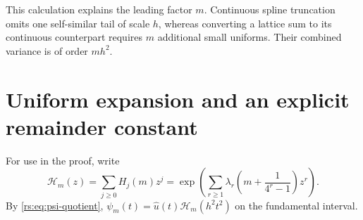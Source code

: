 \documentclass[11pt,a4paper,oneside,openany]{book}
\numberwithin{equation}{chapter}
\theoremstyle{definition}
\theoremstyle{remark}
\begin{document}
This calculation explains the leading factor $m$. Continuous spline
truncation omits one self-similar tail of scale $h$, whereas converting
a lattice sum to its continuous counterpart requires $m$ additional
small uniforms. Their combined variance is of order $mh^2$.

\section{Uniform expansion and an explicit remainder constant}

For use in the proof, write
\begin{equation}
 \mathcal H_m(z)=\sum_{j\geq0}H_j(m)z^j
 =\exp\left(\sum_{r\geq1}\lambda_r
               \left(m+\frac1{4^r-1}\right)z^r\right).
\end{equation}
By \eqref{rs:eq:psi-quotient},
$\psi_m(t)=\widehat u(t)\mathcal H_m(h^2t^2)$ on the fundamental interval.
\end{document}
